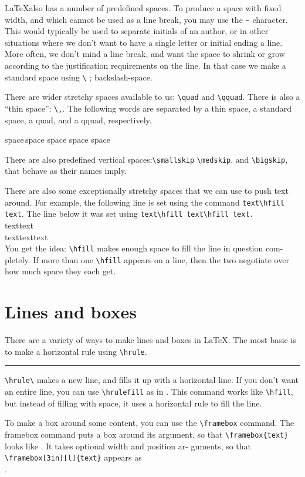 \documentclass[12pt]{article}
\begin{document}
\LaTeX also has a number of predefined spaces. To produce a space with
fixed width, and which cannot be used as a line break, you may use the \verb|~|
character. This would typically be used to separate initials of an author,
or in other situations where we don’t want to have a single letter or initial
ending a line. More often, we don’t mind a line break, and want the space
to shrink or grow according to the justification requirements on the line. In
that case we make a standard space using \verb|\| ; backslash-space.

There are wider stretchy spaces available to us: \verb|\quad| and \verb|\qquad|. There
is also a “thin space”: \verb|\,|. The following words are separated by a thin space,
a standard space, a quad, and a qquad, respectively.
\begin{center}
space\,space space \quad space \qquad space
\end{center}

There are also predefined vertical spaces:\quad \verb|\smallskip| \quad \verb|\medskip|, and
\verb|\bigskip|, that behave as their names imply.

There are also some exceptionally stretchy spaces that we can use to
push text around. For example, the following line is set using the command \verb|text\hfill text|. The line below it was set using \verb|text\hfill text\hfill text.|\\
text\hfill text\\
text\hfill text\hfill text\\
You get the idea: \verb|\hfill| makes enough space to fill the line in question com-
pletely. If more than one \verb|\hfill| appears on a line, then the two negotiate
over how much space they each get.
\section{Lines and boxes}
There are a variety of ways to make lines and boxes in \LaTeX. The most
basic is to make a horizontal rule using \verb|\hrule|.
\hrule
\pagebreak
\verb|\hrule\| makes a new line, and fills it up with a horizontal line. If you
don’t want an entire line, you can use \verb|\hrulefill| as in \hrulefill . This command works like \verb|\hfill|, but instead of filling with space, it uses a
horizontal rule to fill the line.

To make a box around some content, you can use the \verb|\framebox| command. The framebox command puts a box around its argument, so that
\verb|\framebox{text}| looks like . It takes optional width and position ar-
guments, so that \verb|\framebox[3in][l]{text}| appears as\\ .
\end{document}
